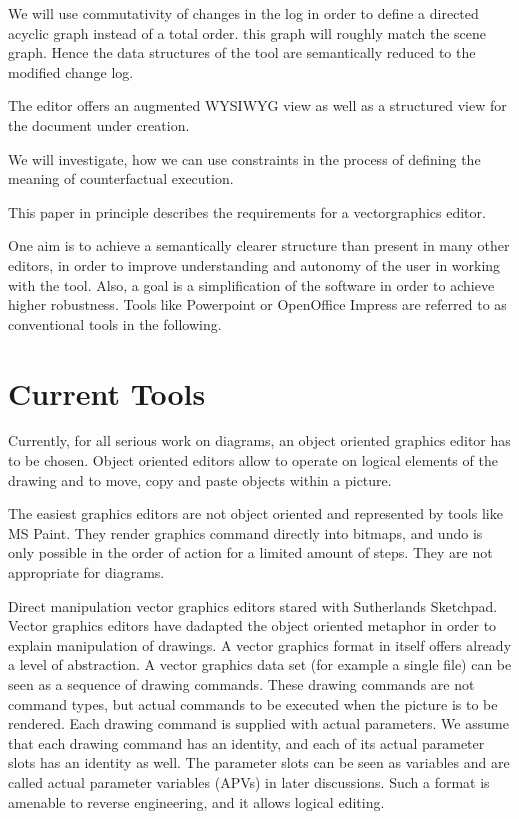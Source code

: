 \documentclass{sig-alternate}
\begin{document}
We will use commutativity of changes in the log in order to define a directed acyclic graph instead of a total order. this graph will roughly match the scene graph. Hence the data structures of the tool are semantically reduced to the modified change log.

The editor offers an augmented WYSIWYG view as well as a structured view for the document under creation. 

We will investigate, how we can use constraints in the process of defining the meaning of counterfactual execution. 

This paper in principle describes the requirements for a vectorgraphics editor. 

One aim is to achieve a semantically clearer structure than present in many other editors, in order to improve understanding and autonomy of the user in working with the tool. Also, a goal is a simplification of the software in order to achieve higher robustness.
Tools like Powerpoint or OpenOffice Impress are referred to as conventional tools in the following.


\section{Current Tools}
Currently, for all serious work on diagrams, an object oriented graphics editor has to be chosen.
Object oriented editors allow to operate on logical elements of the drawing and to move, copy and paste
objects within a picture.

The easiest graphics editors are not object oriented and represented by tools like MS Paint. 
They render graphics command directly into bitmaps, and undo is only possible in the order of
action for a limited amount of steps. They are not appropriate for diagrams.

Direct manipulation vector graphics editors stared with Sutherlands Sketchpad. Vector graphics editors have dadapted the object oriented metaphor in order to explain manipulation of drawings. 
A vector graphics 
format in itself offers already a level of abstraction. A vector graphics data set (for
example a single file) can be seen as a sequence of drawing commands. These drawing commands are 
not command types, but actual commands to be executed when the picture is to be rendered. 
Each drawing command is supplied with actual parameters. We assume that each drawing command
has an identity, and each of its actual parameter slots has an identity as well. 
The parameter slots can be seen as variables and are called actual parameter variables (APVs) in later discussions.
Such a format is amenable to reverse engineering, and it allows logical editing.
\end{document}
